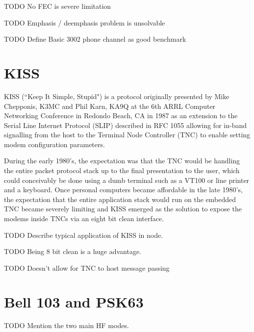 TODO No FEC is severe limitation

TODO Emphasis / deemphasis problem is unsolvable

TODO Define Basic 3002 phone channel as good benchmark

\chapter{KISS}

KISS (``Keep It Simple, Stupid") is a protocol originally presented by 
Mike Chepponis, K3MC and Phil Karn, KA9Q at the 6th ARRL Computer Networking
Conference in Redondo Beach, CA in 1987 as an extension to the Serial Line 
Internet Protocol (SLIP) described in RFC 1055 allowing for in-band signalling from 
the host to the Terminal Node Controller (TNC) to enable setting modem 
configuration parameters. 

During the early 1980's, the expectation was that the TNC would be handling 
the entire packet protocol stack up to the final presentation to the user, which
could conceivably be done using a dumb terminal such as a VT100 or line printer 
and a keyboard. 
Once personal computers became affordable in the late 1980's, the expectation that
the entire application stack would run on the embedded TNC became severely limiting
and KISS emerged as the solution to expose the modems inside TNCs via 
an eight bit clean interface.

TODO Describe typical application of KISS in node.

TODO Being 8 bit clean is a huge advantage.

TODO Doesn't allow for TNC to host message passing

\chapter{Bell 103 and PSK63}

TODO Mention the two main HF modes. 

